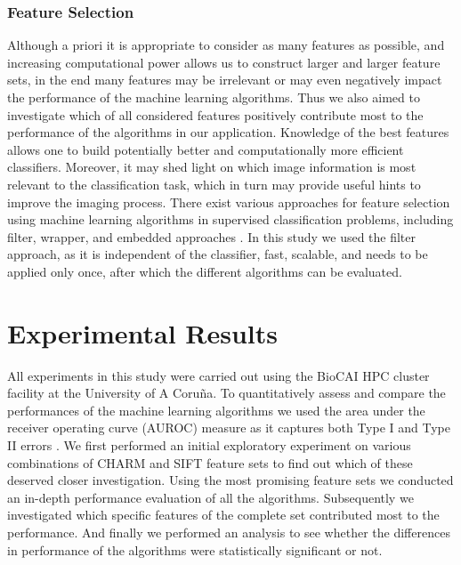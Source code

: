 \subsubsection{Feature Selection}
\label{subsubsec:featureSelection}

Although a priori it is appropriate to consider as many features as possible, and increasing  computational power allows us to construct larger and larger feature sets, in the end many features may be irrelevant or may even negatively impact the performance of the machine learning algorithms. Thus we also aimed to investigate which of all considered features positively contribute most to the performance of the algorithms in our application. Knowledge of the best features allows one to build potentially better and computationally more efficient classifiers. Moreover, it may shed light on which image information is most relevant to the classification task, which in turn may provide useful hints to improve the imaging process. There exist various approaches for feature selection using machine learning algorithms in supervised classification problems, including filter, wrapper, and embedded approaches \citep{doi:10.1093/bioinformatics/btm344}. In this study we used the filter approach, as it is independent of the classifier, fast, scalable, and needs to be applied only once, after which the different algorithms can be evaluated.

\section{Experimental Results}
\label{sec:experimental-results}

All experiments in this study were carried out using the BioCAI HPC cluster facility at the University of A Coru\~{n}a. To quantitatively assess and compare the performances of the machine learning algorithms we used the area under the receiver operating curve (AUROC) measure as it captures both Type I and Type II errors \citep{Fawcett:2006:IRA:1159473.1159475}. We first performed an initial exploratory experiment on various combinations of CHARM and SIFT feature sets to find out which of these deserved closer investigation. Using the most promising feature sets we conducted an in-depth performance evaluation of all the algorithms. Subsequently we investigated which specific features of the complete set contributed most to the performance. And finally we performed an analysis to see whether the differences in performance of the algorithms were statistically significant or not.

